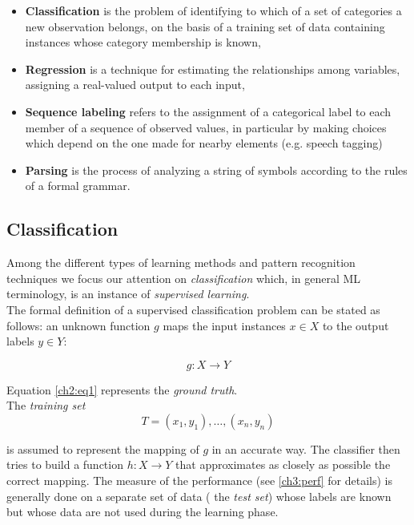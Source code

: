 \begin{itemize}
 \item \textbf{Classification} is the problem of identifying to which of a set of categories a new observation belongs, on the basis
 of a training set of data containing instances whose category membership is known,
 \item \textbf{Regression} is a technique for estimating the relationships among variables, assigning a real-valued output to each input,
 \item \textbf{Sequence labeling} refers to the assignment of a categorical label to each member of a sequence of observed values,
 in particular by making choices which depend on the one made for nearby elements (e.g. speech tagging)
 \item \textbf{Parsing} is the process of analyzing a string of symbols according to the rules of a formal grammar.
\end{itemize}

\subsection{Classification}

Among the different types of learning methods and pattern recognition techniques we focus our attention on \textit{classification} which, in general \Gls{ML} 
terminology, is an instance of \textit{supervised learning}.\\
The formal definition of a supervised classification problem can be stated as follows: an unknown function $g$ maps the input instances $x \in X$ to the output labels $y \in Y$:

\begin{equation}
 \label{ch2:eq1}
 g: X \rightarrow Y
\end{equation}

Equation \ref{ch2:eq1} represents the \textit{ground truth}.\\
The \textit{training set}
\begin{equation}
 T = { (x_1,y_1), \ldots ,(x_n,y_n) }
\end{equation}

is assumed to represent the mapping of $g$ in an accurate way. The classifier then tries to build a function $h: X \rightarrow Y$ that approximates as closely as possible the correct mapping. The measure of the performance
(see \ref{ch3:perf} for details) is generally done on a separate set of data ( the \textit{test set}) whose labels are known but whose data are not used during the learning phase\cite{liu2006pattern}.

